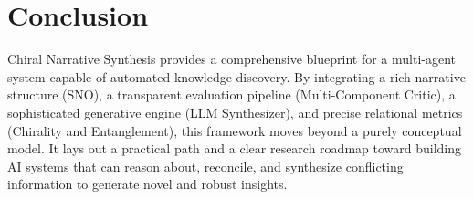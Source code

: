 \documentclass[12pt, a4paper]{article}
\begin{document}
\section{Conclusion}
Chiral Narrative Synthesis provides a comprehensive blueprint for a multi-agent system capable of automated knowledge discovery. By integrating a rich narrative structure (SNO), a transparent evaluation pipeline (Multi-Component Critic), a sophisticated generative engine (LLM Synthesizer), and precise relational metrics (Chirality and Entanglement), this framework moves beyond a purely conceptual model. It lays out a practical path and a clear research roadmap toward building AI systems that can reason about, reconcile, and synthesize conflicting information to generate novel and robust insights.



\end{document}
